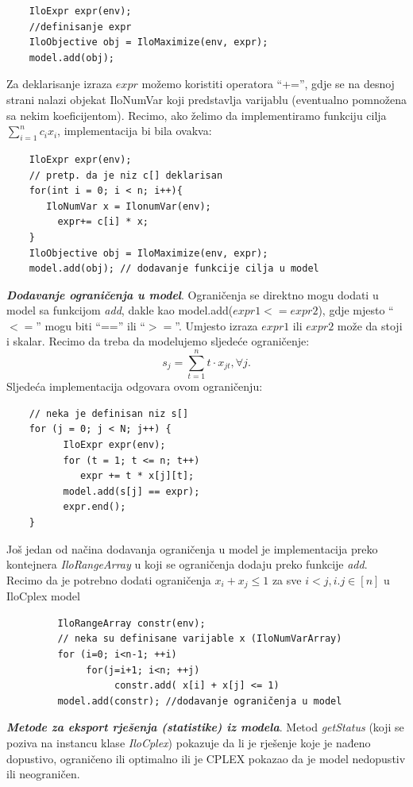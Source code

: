 \documentclass[a4paper, utf8, 11pt, colorlinks]{book}
\begin{document}
 \begin{verbatim}
 	IloExpr expr(env);
 	//definisanje expr
 	IloObjective obj = IloMaximize(env, expr);
 	model.add(obj);
 \end{verbatim}
 
 \noindent Za deklarisanje izraza $expr$ možemo koristiti operatora ``+='', gdje se na desnoj strani nalazi objekat IloNumVar koji predstavlja varijablu (eventualno pomnožena sa nekim koeficijentom). 
 Recimo, ako želimo da implementiramo funkciju cilja $\sum_{i=1}^n c_i x_i$, implementacija bi bila ovakva:
 
 \begin{verbatim}
 	IloExpr expr(env);
 	// pretp. da je niz c[] deklarisan
 	for(int i = 0; i < n; i++){
       IloNumVar x = IlonumVar(env);
 	     expr+= c[i] * x;
 	}
 	IloObjective obj = IloMaximize(env, expr);
 	model.add(obj); // dodavanje funkcije cilja u model
 \end{verbatim}
 
 \noindent \textbf{\emph{Dodavanje ograničenja u model}}. Ograničenja se direktno mogu dodati  u model sa funkcijom \emph{add}, dakle kao 
 model.add($expr1 <= expr2$), gdje mjesto ``$<=$'' mogu biti ``=='' ili ``$>=$''. Umjesto izraza $expr1$ ili $expr2$ može da stoji i skalar. Recimo da treba da modelujemo sljedeće ograničenje:
 $$s_j = \sum_{t=1}^n t \cdot x_{jt}, \forall j.$$ 
 Sljedeća implementacija odgovara ovom ograničenju: 
 \begin{verbatim}
 	// neka je definisan niz s[]
 	for (j = 0; j < N; j++) {
 		  IloExpr expr(env);
 		  for (t = 1; t <= n; t++)
 	  	     expr += t * x[j][t];            
 		  model.add(s[j] == expr);
 		  expr.end();
 	}
 \end{verbatim}
 Još jedan od načina dodavanja ograničenja u model je implementacija preko kontejnera \emph{IloRangeArray} u koji se ograničenja dodaju preko funkcije \emph{add}.   
 Recimo da je potrebno dodati ograničenja $x_i + x_j \leq 1$ za sve $i<j, i.j \in [n]$ u IloCplex model
 
 \begin{verbatim}
 	     IloRangeArray constr(env);
 	     // neka su definisane varijable x (IloNumVarArray) 
 	     for (i=0; i<n-1; ++i)
 	          for(j=i+1; i<n; ++j)
 	               constr.add( x[i] + x[j] <= 1)     
      	 model.add(constr); //dodavanje ograničenja u model
 \end{verbatim}
 
 \noindent \textbf{\emph{Metode za eksport rješenja (statistike) iz modela}}. Metod \emph{getStatus} (koji se poziva na instancu klase \emph{IloCplex})  pokazuje da li je rješenje koje je nađeno dopustivo, ograničeno ili optimalno ili je CPLEX pokazao da je model nedopustiv ili neograničen.
 
\end{document}
